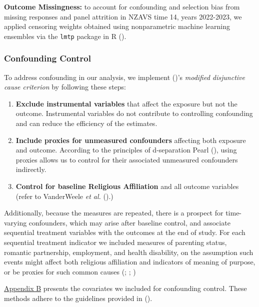 \documentclass[
  single column]{article}
\providecommand{\tightlist}{%
  \setlength{\itemsep}{0pt}\setlength{\parskip}{0pt}}\usepackage{longtable,booktabs,array}
\begin{document}
\textbf{Outcome Missingness:} to account for confounding and selection
bias from missing responses and panel attrition in NZAVS time 14, years
2022-2023, we applied censoring weights obtained using nonparametric
machine learning ensembles via the \texttt{lmtp} package in R
().

\subsubsection{Confounding Control}\label{confounding-control}

To address confounding in our analysis, we implement
()'s \emph{modified
disjunctive cause criterion} by following these steps:

\begin{enumerate}
\def\labelenumi{\arabic{enumi}.}
\setcounter{enumi}{1}
\tightlist
\item
  \textbf{Exclude instrumental variables} that affect the exposure but
  not the outcome. Instrumental variables do not contribute to
  controlling confounding and can reduce the efficiency of the
  estimates.
\item
  \textbf{Include proxies for unmeasured confounders} affecting both
  exposure and outcome. According to the principles of d-separation
  Pearl (), using proxies allows us to
  control for their associated unmeasured confounders indirectly.
\item
  \textbf{Control for baseline Religious Affiliation} and all outcome
  variables (refer to VanderWeele \emph{et al.}
  ().)
\end{enumerate}

Additionally, because the measures are repeated, there is a prospect for
time-varying confounders, which may arise after baseline control, and
associate sequential treatment variables with the outcomes at the end of
study. For each sequential treatment indicator we included measures of
parenting status, romantic partnership, employment, and health
disability, on the assumption such events might affect both religious
affiliation and indicators of meaning of purpose, or be proxies for such
common causes (;
;
)

\hyperref[appendix-demographics]{Appendix B} presents the covariates we
included for confounding control. These methods adhere to the guidelines
provided in ().
\end{document}
